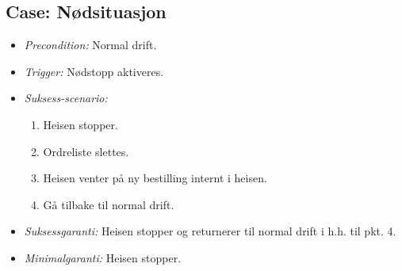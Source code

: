 \documentclass[a4paper, norsk, titlepage]{scrartcl}
\begin{document}
\subsection*{Case: Nødsituasjon}
\begin{itemize}
\item \emph{Precondition:} Normal drift.
\item \emph{Trigger:} Nødstopp aktiveres.
\item \emph{Suksess-scenario:}
\begin{enumerate}
\item Heisen stopper.
\item Ordreliste slettes.
\item Heisen venter på ny bestilling internt i heisen.
\item Gå tilbake til normal drift.
\end{enumerate}
\item \emph{Suksessgaranti:} Heisen stopper og returnerer til normal drift i h.h. til pkt. 4.
\item \emph{Minimalgaranti:} Heisen stopper.

\end{itemize}
\end{document}

